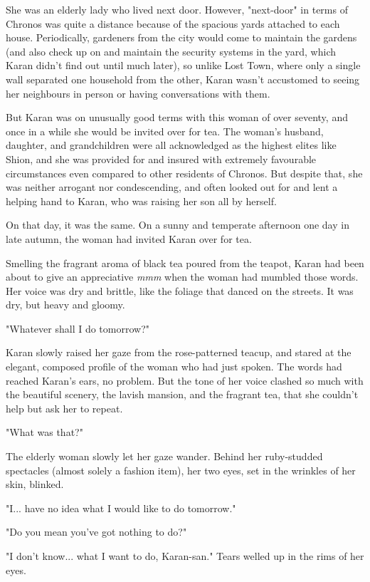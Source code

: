 She was an elderly lady who lived next door. However, "next-door" in
terms of Chronos was quite a distance because of the spacious yards
attached to each house. Periodically, gardeners from the city would come
to maintain the gardens (and also check up on and maintain the security
systems in the yard, which Karan didn't find out until much later), so
unlike Lost Town, where only a single wall separated one household from
the other, Karan wasn't accustomed to seeing her neighbours in person or
having conversations with them.

But Karan was on unusually good terms with this woman of over seventy,
and once in a while she would be invited over for tea. The woman's
husband, daughter, and grandchildren were all acknowledged as the
highest elites like Shion, and she was provided for and insured with
extremely favourable circumstances even compared to other residents of
Chronos. But despite that, she was neither arrogant nor condescending,
and often looked out for and lent a helping hand to Karan, who was
raising her son all by herself.

On that day, it was the same. On a sunny and temperate afternoon one day
in late autumn, the woman had invited Karan over for tea.

Smelling the fragrant aroma of black tea poured from the teapot, Karan
had been about to give an appreciative \emph{mmm} when the woman had mumbled
those words. Her voice was dry and brittle, like the foliage that danced
on the streets. It was dry, but heavy and gloomy.

"Whatever shall I do tomorrow?"

Karan slowly raised her gaze from the rose-patterned teacup, and stared
at the elegant, composed profile of the woman who had just spoken. The
words had reached Karan's ears, no problem. But the tone of her voice
clashed so much with the beautiful scenery, the lavish mansion, and the
fragrant tea, that she couldn't help but ask her to repeat.

"What was that?"

The elderly woman slowly let her gaze wander. Behind her ruby-studded
spectacles (almost solely a fashion item), her two eyes, set in the
wrinkles of her skin, blinked.

"I... have no idea what I would like to do tomorrow."

"Do you mean you've got nothing to do?"

"I don't know... what I want to do, Karan-san." Tears welled up in the
rims of her eyes.

